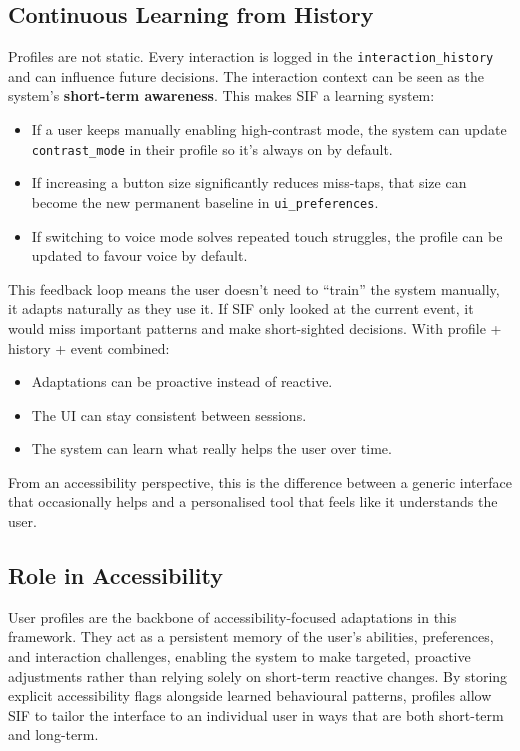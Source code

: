 \subsection{Continuous Learning from History}
Profiles are not static. Every interaction is logged in the \texttt{interaction\_history} and can influence future decisions. The interaction context can be seen as the system's \textbf{short-term awareness}.
This makes SIF a learning system:
\begin{itemize}
    \item If a user keeps manually enabling high-contrast mode, the system can update \texttt{contrast\_mode} in their profile so it’s always on by default.
    \item If increasing a button size significantly reduces miss-taps, that size can become the new permanent baseline in \texttt{ui\_preferences}.
    \item If switching to voice mode solves repeated touch struggles, the profile can be updated to favour voice by default.
\end{itemize}
This feedback loop means the user doesn’t need to “train” the system manually, it adapts naturally as they use it. If SIF only looked at the current event, it would miss important patterns and make short-sighted decisions.
With profile + history + event combined:
\begin{itemize}
    \item Adaptations can be proactive instead of reactive.
    \item The UI can stay consistent between sessions.
    \item The system can learn what really helps the user over time.
\end{itemize}
From an accessibility perspective, this is the difference between a generic interface that occasionally helps and a personalised tool that feels like it understands the user.

\subsection{Role in Accessibility}
User profiles are the backbone of accessibility-focused adaptations in this framework. They act as a persistent memory of the user’s abilities, preferences, and interaction challenges, enabling the system to make targeted, proactive adjustments rather than relying solely on short-term reactive changes. By storing explicit accessibility flags alongside learned behavioural patterns, profiles allow SIF to tailor the interface to an individual user in ways that are both short-term and long-term.

